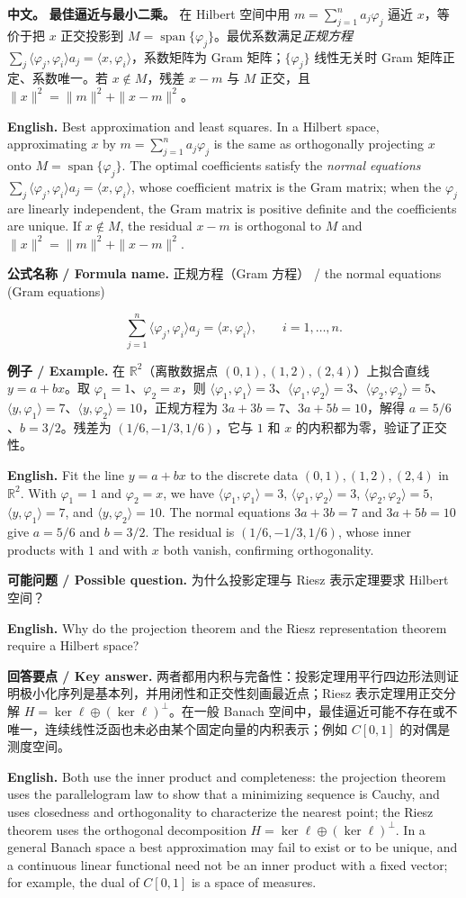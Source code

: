 \documentclass[UTF8,11pt,a4paper]{ctexart}
\newcommand{\EN}[1]{\par\noindent \textbf{English.} #1\par}
\newcommand{\FORMULA}[2]{\par\noindent\textbf{公式名称 / Formula name.} #1 / #2\par}
\newcommand{\EX}[2]{\par\noindent \textbf{例子 / Example.} #1\par\EN{#2}}
\newcommand{\ASK}[4]{\par\noindent \textbf{可能问题 / Possible question.} #1\par\EN{#2}\noindent \textbf{回答要点 / Key answer.} #3\par\EN{#4}\smallskip}
\newcommand{\APS}[2]{\par\noindent\textbf{中文。} #1\par\noindent\textbf{English.} #2\par\smallskip}
\begin{document}
\APS{\textbf{最佳逼近与最小二乘。} 在 Hilbert 空间中用 $m=\sum_{j=1}^na_j\varphi_j$ 逼近 $x$，等价于把 $x$ 正交投影到 $M=\operatorname{span}\{\varphi_j\}$。最优系数满足\emph{正规方程} $\sum_j\langle\varphi_j,\varphi_i\rangle a_j=\langle x,\varphi_i\rangle$，系数矩阵为 Gram 矩阵；$\{\varphi_j\}$ 线性无关时 Gram 矩阵正定、系数唯一。若 $x\notin M$，残差 $x-m$ 与 $M$ 正交，且 $\|x\|^2=\|m\|^2+\|x-m\|^2$。}{Best approximation and least squares. In a Hilbert space, approximating $x$ by $m=\sum_{j=1}^na_j\varphi_j$ is the same as orthogonally projecting $x$ onto $M=\operatorname{span}\{\varphi_j\}$. The optimal coefficients satisfy the \emph{normal equations} $\sum_j\langle\varphi_j,\varphi_i\rangle a_j=\langle x,\varphi_i\rangle$, whose coefficient matrix is the Gram matrix; when the $\varphi_j$ are linearly independent, the Gram matrix is positive definite and the coefficients are unique. If $x\notin M$, the residual $x-m$ is orthogonal to $M$ and $\|x\|^2=\|m\|^2+\|x-m\|^2$.}
\FORMULA{正规方程（Gram 方程）}{the normal equations (Gram equations)}
\[
\sum_{j=1}^n\langle\varphi_j,\varphi_i\rangle a_j=\langle x,\varphi_i\rangle,
\qquad i=1,\ldots,n.
\]
\EX{在 $\mathbb R^2$（离散数据点 $(0,1),(1,2),(2,4)$）上拟合直线 $y=a+bx$。取 $\varphi_1=1$、$\varphi_2=x$，则 $\langle\varphi_1,\varphi_1\rangle=3$、$\langle\varphi_1,\varphi_2\rangle=3$、$\langle\varphi_2,\varphi_2\rangle=5$、$\langle y,\varphi_1\rangle=7$、$\langle y,\varphi_2\rangle=10$，正规方程为 $3a+3b=7$、$3a+5b=10$，解得 $a=5/6$、$b=3/2$。残差为 $(1/6,-1/3,1/6)$，它与 $1$ 和 $x$ 的内积都为零，验证了正交性。}{Fit the line $y=a+bx$ to the discrete data $(0,1),(1,2),(2,4)$ in $\mathbb R^2$. With $\varphi_1=1$ and $\varphi_2=x$, we have $\langle\varphi_1,\varphi_1\rangle=3$, $\langle\varphi_1,\varphi_2\rangle=3$, $\langle\varphi_2,\varphi_2\rangle=5$, $\langle y,\varphi_1\rangle=7$, and $\langle y,\varphi_2\rangle=10$. The normal equations $3a+3b=7$ and $3a+5b=10$ give $a=5/6$ and $b=3/2$. The residual is $(1/6,-1/3,1/6)$, whose inner products with $1$ and with $x$ both vanish, confirming orthogonality.}

\ASK{为什么投影定理与 Riesz 表示定理要求 Hilbert 空间？}{Why do the projection theorem and the Riesz representation theorem require a Hilbert space?}{两者都用内积与完备性：投影定理用平行四边形法则证明极小化序列是基本列，并用闭性和正交性刻画最近点；Riesz 表示定理用正交分解 $H=\ker\ell\oplus(\ker\ell)^\perp$。在一般 Banach 空间中，最佳逼近可能不存在或不唯一，连续线性泛函也未必由某个固定向量的内积表示；例如 $C[0,1]$ 的对偶是测度空间。}{Both use the inner product and completeness: the projection theorem uses the parallelogram law to show that a minimizing sequence is Cauchy, and uses closedness and orthogonality to characterize the nearest point; the Riesz theorem uses the orthogonal decomposition $H=\ker\ell\oplus(\ker\ell)^\perp$. In a general Banach space a best approximation may fail to exist or to be unique, and a continuous linear functional need not be an inner product with a fixed vector; for example, the dual of $C[0,1]$ is a space of measures.}
\end{document}
